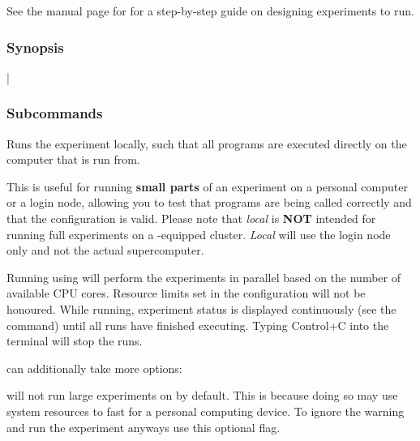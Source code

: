 \documentclass[a4paper,english]{article}
\begin{document}
\begin{adjustwidth}{18pt}{0pt}
                See the manual page for  for a step-by-step guide on
                designing experiments to run.


            \subsubsection{Synopsis}
                |

            \subsubsection{Subcommands}
                \begin{Description}[Subcommands]
                    \item[\Arg{local}]
                        Runs the experiment locally, such that all programs are executed directly on the computer
                        that  is run from.

                        This is useful for running \textbf{small parts} of an experiment on
                        a personal computer or a login node, allowing you to test that programs
                        are being called correctly and that the configuration is valid.
                        Please note that \emph{local} is \textbf{NOT} intended for running full
                        experiments on a -equipped cluster.
                        \emph{Local} will use the login node only and not the actual
                        supercomputer.

                        Running using   will perform the experiments in
                        parallel based on the number of available CPU cores.
                        Resource limits set in the configuration will not be honoured.
                        While running, experiment status is displayed continuously (see the
                          command) until all runs have finished executing.
                        Typing Control+C into the terminal will stop the runs.

                         can additionally take more options:
                            \begin{Description}[Options]
                                \item[\oOpt{\ddash force}]
                                   will not run large experiments on  by default. This is
                                  because doing so may use system resources to fast for a personal computing device.
                                  To ignore the warning and run the experiment anyways use this optional flag.


\end{Description}
\end{Description}
\end{adjustwidth}
\end{document}
